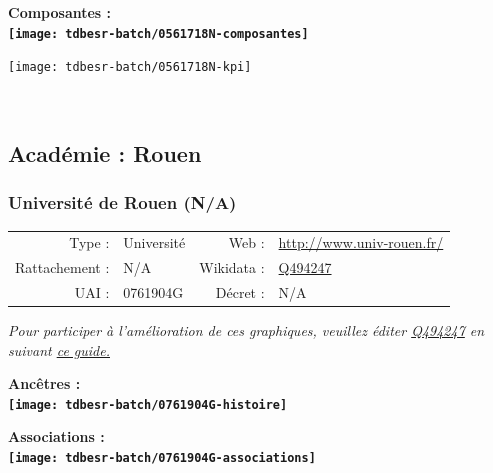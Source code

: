 \documentclass[12pt,french,]{article}
\begin{document}
\begin{center} \bf Composantes : \\  
\texttt{[image: tdbesr-batch/0561718N-composantes]} \end{center}

\begin{center}\texttt{[image: tdbesr-batch/0561718N-kpi]} \end{center}\checkoddpage

\ifoddpage \fi ~\newpage  

\hypertarget{acaduxe9mie-rouen}{%
\subsection{Académie : Rouen}\label{acaduxe9mie-rouen}}

\hypertarget{universituxe9-de-rouen-na}{%
\subsubsection{Université de Rouen
(N/A)}\label{universituxe9-de-rouen-na}}

\begin{tabular*}{\textwidth}{rp{5cm}rl}  
\hline  
Type : & Université & Web : &\href{http://www.univ-rouen.fr/}{http://www.univ-rouen.fr/} \\  
Rattachement : & N/A & Wikidata : & \href{https://www.wikidata.org/entity/Q494247}{Q494247} \\  
UAI : & 0761904G & Décret : & N/A \\  
\hline  
\end{tabular*}

\textit{\scriptsize Pour participer à l'amélioration de ces graphiques, veuillez éditer  \href{https://www.wikidata.org/entity/Q494247}{Q494247}  en suivant \href{https://github.com/cpesr/wikidataESR/blob/master/Rmd/wikidataESR.md}{ce guide.}}

\vspace{1cm}  
\begin{minipage}[b]{0.50\textwidth}\begin{center} \bf Ancêtres : \\  
\texttt{[image: tdbesr-batch/0761904G-histoire]} \end{center}\end{minipage}\begin{minipage}[b]{0.50\textwidth}\begin{center} \bf Associations : \\  
\texttt{[image: tdbesr-batch/0761904G-associations]} \end{center}\end{minipage}
\end{document}

